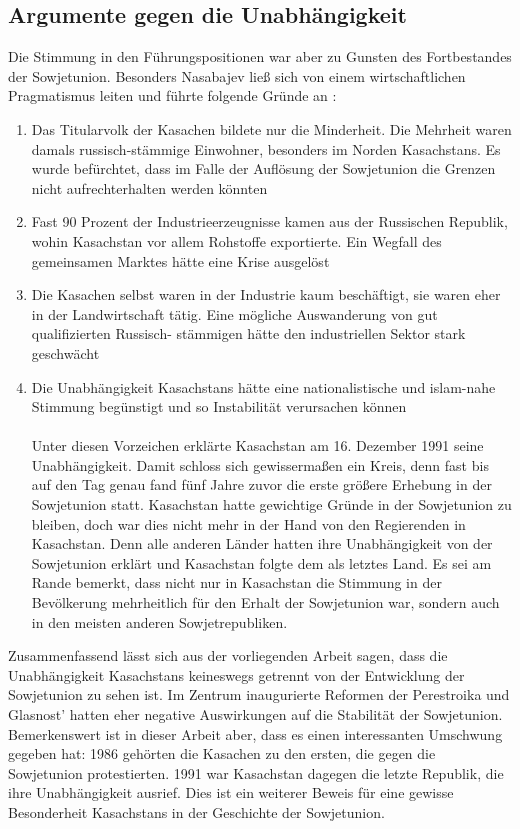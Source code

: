 \documentclass{../../sem_paper}
\begin{document}
\subsection{Argumente gegen die Unabhängigkeit}
Die Stimmung in den Führungspositionen war aber zu Gunsten des Fortbestandes der
Sowjetunion. Besonders Nasabajev ließ sich von einem wirtschaftlichen Pragmatismus
leiten und führte folgende Gründe an \autocite[62]{trut1994}:
\begin{enumerate}
 \item Das Titularvolk der Kasachen bildete nur die Minderheit. Die Mehrheit waren
damals russisch-stämmige Einwohner, besonders im Norden Kasachstans. Es wurde
befürchtet, dass im Falle der Auflösung der Sowjetunion die Grenzen nicht
aufrechterhalten werden könnten

\item Fast 90 Prozent der Industrieerzeugnisse kamen aus der Russischen Republik,
wohin Kasachstan vor allem Rohstoffe exportierte. Ein Wegfall des gemeinsamen
Marktes hätte eine Krise ausgelöst
\item Die Kasachen selbst waren in der Industrie kaum beschäftigt, sie waren eher in
der Landwirtschaft tätig. Eine mögliche Auswanderung von gut qualifizierten Russisch-
stämmigen hätte den industriellen Sektor stark geschwächt
\item Die Unabhängigkeit Kasachstans hätte eine nationalistische und islam-nahe
Stimmung begünstigt und so Instabilität verursachen können
\\
\\
Unter diesen Vorzeichen erklärte Kasachstan am 16. Dezember 1991 seine
Unabhängigkeit. Damit schloss sich gewissermaßen ein Kreis, denn fast bis auf den Tag
genau fand fünf Jahre zuvor die erste größere Erhebung in der Sowjetunion statt.
Kasachstan hatte gewichtige Gründe in der Sowjetunion zu bleiben, doch war dies nicht
mehr in der Hand von den Regierenden in Kasachstan. Denn alle anderen Länder hatten
ihre Unabhängigkeit von der Sowjetunion erklärt und Kasachstan folgte dem als letztes
Land. Es sei am Rande bemerkt, dass nicht nur in Kasachstan die Stimmung in der
Bevölkerung mehrheitlich für den Erhalt der Sowjetunion war, sondern auch in den
meisten anderen Sowjetrepubliken.
\end{enumerate}

Zusammenfassend lässt sich aus der vorliegenden Arbeit sagen, dass die
Unabhängigkeit
Kasachstans
keineswegs
getrennt
von
der
Entwicklung
der
Sowjetunion zu sehen ist. Im Zentrum inaugurierte Reformen der Perestroika und
Glasnost' hatten eher negative Auswirkungen auf die Stabilität der Sowjetunion.
Bemerkenswert ist in dieser Arbeit aber, dass es einen interessanten Umschwung
gegeben hat: 1986 gehörten die Kasachen zu den ersten, die gegen die Sowjetunion
protestierten. 1991 war Kasachstan dagegen die letzte Republik, die ihre
Unabhängigkeit ausrief. Dies ist ein weiterer Beweis für eine gewisse Besonderheit
Kasachstans in der Geschichte der Sowjetunion.

\literature
\end{document}
